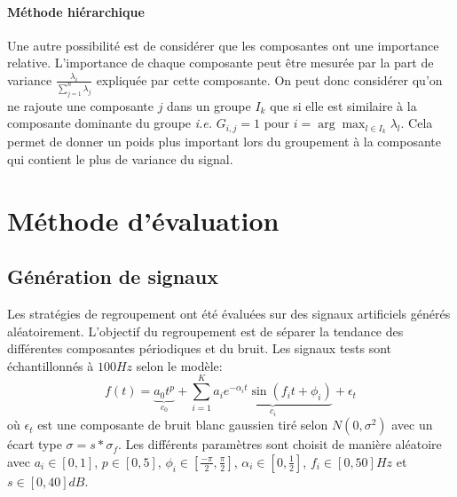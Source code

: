 \documentclass{gretsi}
\newcommand{\set}[1]{\left \{ 1, \dots, #1 \right \}}
\newcommand{\inter}{\left[0, 1\right]}
\begin{document}
\paragraph{Méthode hiérarchique}
Une autre possibilité est de considérer que les composantes ont une importance relative. L'importance de chaque composante peut être mesurée par la part de variance $\frac{\lambda_i}{\sum_{j=1}^n \lambda_j}$ expliquée par cette composante. On peut donc considérer qu'on ne rajoute une composante $j$ dans un groupe $I_k$ que si elle est similaire à la composante dominante du groupe \emph{ i.e. } $G_{i, j} = 1$ pour $i = \arg\max_{l \in I_k} \lambda_l$. Cela permet de donner un poids plus important lors du groupement à la composante qui contient le plus de variance du signal.



\section{Méthode d'évaluation}
\label{sec:eval}

\subsection{Génération de signaux}
\label{sub:artsig}

    Les stratégies de regroupement ont été évaluées sur des signaux artificiels générés aléatoirement. L'objectif du regroupement est de séparer la tendance des différentes composantes périodiques et du bruit. Les signaux tests sont échantillonnés à $100Hz$ selon le modèle:
    \begin{equation}\label{eq:artsig}
    f(t) = \underbrace{a_0 t^p}_{c_0} + \sum_{i=1}^K \underbrace{a_i e^{-\alpha_i t} \sin\left(f_i t + \phi_i\right)}_{c_i} + \epsilon_t
    \end{equation}où $\epsilon_t$  est une composante de bruit blanc gaussien tiré selon $N(0, \sigma^2)$ avec un écart type $\sigma = s*\sigma_f$. Les différents paramètres sont choisit de manière aléatoire avec $a_i \in \inter$, $p \in \left[0, 5\right]$, $\displaystyle \phi_i \in\left[\frac{-\pi}{2}, \frac{\pi}{2}\right]$, $\alpha_i \in \left[0, \frac{1}{2}\right]$, $f_i \in \left[0, 50\right]Hz$ et $s \in \left[0, 40\right]dB$.
    
\end{document}

